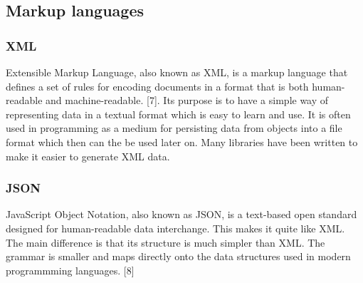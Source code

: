 \subsection{Markup languages}

\subsubsection{XML}
Extensible Markup Language, also known as XML, is a markup language that defines a set of rules for encoding documents in a format that is both human-readable and machine-readable.  [7]. Its purpose is to have a simple way of representing data in a textual format which is easy to learn and use. It is often used in programming as a medium for persisting data from objects into a file format which then can the be used later on. Many libraries have been written to make it easier to generate XML data.

\subsubsection{JSON}
JavaScript Object Notation, also known as JSON, is a text-based open standard designed for human-readable data interchange. This makes it quite like XML. The main difference is that its structure is much simpler than XML. The grammar is smaller and maps directly onto the data structures used in modern programmming languages. [8]


